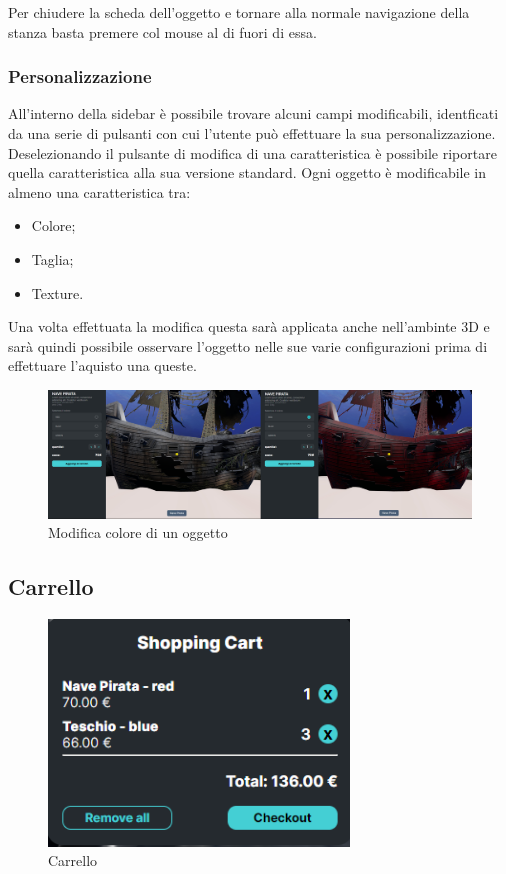 Per chiudere la scheda dell'oggetto e tornare alla normale navigazione della stanza basta premere col mouse al di fuori di essa.
\subsubsection{Personalizzazione}
All'interno della sidebar è possibile trovare alcuni campi modificabili, identficati da una serie di pulsanti con cui l'utente può effettuare la sua personalizzazione.
Deselezionando il pulsante di modifica di una caratteristica è possibile riportare quella caratteristica alla sua versione standard.
Ogni oggetto è modificabile in almeno una caratteristica tra:
\begin{itemize}
	\item Colore;
	\item Taglia;
	\item Texture.
\end{itemize}
Una volta effettuata la modifica questa sarà applicata anche nell'ambinte 3D e sarà quindi possibile osservare l'oggetto nelle sue varie configurazioni prima di effettuare l'aquisto una queste.
\begin{figure}[H]
  \renewcommand{\thefigure}{6}
\begin{center}
  \includegraphics[width=\linewidth]{./res/images/modifica.png}
\end{center}
  \caption{Modifica colore di un oggetto}
  \label{Modifica colore di un oggetto}
\end{figure}
\pagebreak

\subsection{Carrello}
\begin{figure}[H]
  \renewcommand{\thefigure}{7}
\begin{center}
  \includegraphics[width=8cm]{./res/images/carrello.png}
\end{center}
  \caption{Carrello}
  \label{Carrello}
\end{figure}

